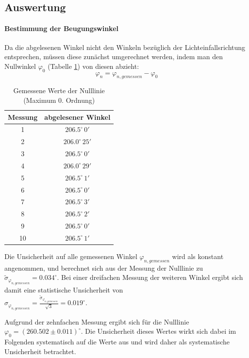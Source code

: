 \documentclass[a4paper, 11pt]{article}
\begin{document}
\clearpage
\subsection{Auswertung}
\paragraph{Bestimmung der Beugungswinkel}\label{Bestimmung der Beugungswinkel}
Da die abgelesenen Winkel nicht den Winkeln bezüglich der Lichteinfallsrichtung entsprechen, müssen diese zunächst umgerechnet werden, indem man den Nullwinkel $\varphi_0$ (Tabelle \ref{table:Nulllinie}) von diesen abzieht:
\begin{equation}
	\varphi_n = \varphi_{n, gemessen} - \varphi_0
\end{equation}

\begin{table}[H]
	\large
	\centering
	\begin{tabular}{|c|c|}
		\hline
		Messung &	abgelesener Winkel \\
		\hline
		1	&	$206.5^{\circ} \, 0'$ \\
		\hline
		2	&	$206.0^{\circ} \, 25'$ \\
		\hline
		3	&	$206.5^{\circ} \, 0'$ \\
		\hline		
		4	&	$206.0^{\circ} \, 29'$ \\
		\hline
		5	&	$206.5^{\circ} \, 1'$ \\
		\hline
		6	&	$206.5^{\circ} \, 0'$ \\
		\hline
		7	&	$206.5^{\circ} \, 3'$ \\
		\hline
		8	&	$206.5^{\circ} \, 2'$ \\
		\hline
		9	&	$206.5^{\circ} \, 0'$ \\
		\hline
		10	&	$206.5^{\circ} \, 1'$ \\
		\hline
	\end{tabular}
	\caption{Gemessene Werte der Nulllinie (Maximum 0. Ordnung)}
	\label{table:Nulllinie}
\end{table}
Die Unsicherheit auf alle gemessenen Winkel $\varphi_{n, gemessen}$ wird als konstant angenommen, und berechnet sich aus der Messung der Nulllinie zu $\tilde{\sigma}_{\varphi_{n, gemessen}} = 0.034^{\circ}$. Bei einer dreifachen Messung der weiteren Winkel ergibt sich damit eine statistische Unsicherheit von \\
$\sigma_{\varphi_{n, gemessen}} = \frac{\tilde{\sigma}_{\varphi_{n, gemessen}}}{\sqrt{3}} = 0.019^{\circ}$.

Aufgrund der zehnfachen Messung ergibt sich für die Nulllinie $\varphi_0 = (260.502 \pm 0.011)^{\circ}$. Die Unsicherheit dieses Wertes wirkt sich dabei im Folgenden systematisch auf die Werte aus und wird daher als systematische Unsicherheit betrachtet.
\end{document}
